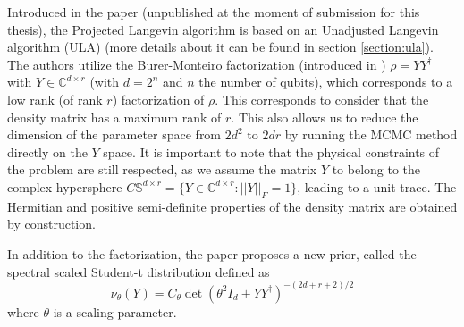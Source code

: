 \documentclass[12pt]{memoir}
\begin{document}
Introduced in the \cite{meth:bayesian:Langevin:ACMT2024} paper (unpublished at the moment of submission for this thesis), the Projected Langevin algorithm is based on an Unadjusted Langevin algorithm (ULA) (more details about it can be found in section \ref{section:ula}). The authors utilize the Burer-Monteiro factorization (introduced in \cite{proj-langevin:Burer2003}) $\rho = Y Y^\dagger$ with $Y \in \mathbb{C}^{d \times r}$ (with $d=2^n$ and $n$ the number of qubits), which corresponds to a low rank (of rank $r$) factorization of $\rho$. This corresponds to consider that the density matrix has a maximum rank of $r$. This also allows us to reduce the dimension of the parameter space from $2d^2$ to $2dr$ by running the MCMC method directly on the $Y$ space. It is important to note that the physical constraints of the problem are still respected, as we assume the matrix $Y$ to belong to the complex hypersphere $C \mathbb{S}^{d\times r} = \{ Y \in \mathbb{C}^{d\times r}: ||Y||_F = 1\}$, leading to a unit trace. The Hermitian and positive semi-definite properties of the density matrix are obtained by construction.\medbreak

In addition to the factorization, the paper proposes a new prior, called the spectral scaled Student-t distribution defined as
\begin{equation}    
\nu_{\theta} (Y) = C_\theta \det(\theta^2I_d + YY^\dagger)^{-(2d+r+2)/2}
\end{equation}
where $\theta$ is a scaling parameter.\medbreak
\end{document}
